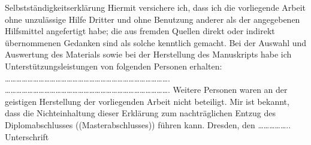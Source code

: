 Selbstständigkeitserklärung
Hiermit versichere ich, dass ich die vorliegende Arbeit ohne unzulässige Hilfe Dritter und ohne Benutzung anderer als der angegebenen Hilfsmittel angefertigt habe; die aus fremden Quellen direkt oder indirekt übernommenen Gedanken sind als solche kenntlich gemacht. Bei der Auswahl und Auswertung des Materials sowie bei der Herstellung des Manuskripts habe ich Unterstützungsleistungen von folgenden Personen erhalten: ……………………………………………………………………………. ……………………………………………………………………………. Weitere Personen waren an der geistigen Herstellung der vorliegenden Arbeit nicht beteiligt. Mir ist bekannt, dass die Nichteinhaltung dieser Erklärung zum nachträglichen Entzug des Diplomabschlusses ((Masterabschlusses)) führen kann. Dresden, den …………….. Unterschrift